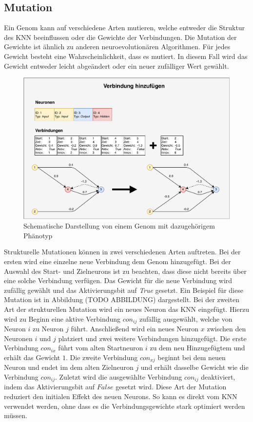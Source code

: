 \subsection{Mutation}
\label{subsec:neat_mutation}
Ein Genom kann auf verschiedene Arten mutieren, welche entweder die Struktur des \ac{KNN} beeinflussen oder die Gewichte der Verbindungen. Die Mutation der Gewichte ist ähnlich zu anderen neuroevolutionären Algorithmen. Für jedes Gewicht besteht eine Wahrscheinlichkeit, dass es mutiert. In diesem Fall wird das Gewicht entweder leicht abgeändert oder ein neuer zufälliger Wert gewählt.\\ %
\begin{figure}[!h]
	\centering
	\includegraphics[width=1\textwidth]{./img/neat-AddConnectionMutation.pdf} 
	\caption{Schematische Darstellung von einem Genom mit dazugehörigem Phänotyp}
	\label{fig:neat_add_connectin_mutation}
\end{figure}
Strukturelle Mutationen können in zwei verschiedenen Arten auftreten. Bei der ersten wird eine einzelne neue Verbindung dem Genom hinzugefügt. Bei der Auswahl des Start- und Zielneurons ist zu beachten, dass diese nicht bereits über eine solche Verbindung verfügen. Das Gewicht für die neue Verbindung wird zufällig gewählt und das Aktivierungsbit auf \emph{True} gesetzt. Ein Beispiel für diese Mutation ist in Abbildung (TODO ABBILDUNG) dargestellt. Bei der zweiten Art der strukturellen Mutation wird ein neues Neuron das \ac{KNN} eingefügt. Hierzu wird zu Beginn eine aktive Verbindung $con_{ij} $ zufällig ausgewählt, welche von Neuron $i$ zu Neuron $j$ führt. Anschließend wird ein neues Neuron $x$ zwischen den Neuronen $i$ und $j$ platziert und zwei weitere Verbindungen hinzugefügt. Die erste Verbindung $con_{ix}$ führt vom alten Startneuron $i$ zu dem neu Hinzugefügtem und erhält das Gewicht $1$. Die zweite Verbindung $con_{xj}$ beginnt bei dem neuen Neuron und endet im dem alten Zielneuron $j$ und erhält dasselbe Gewicht wie die Verbindung $con_{ij}$. Zuletzt wird die ausgewählte Verbindung $con_{ij}$ deaktiviert, indem das Aktivierungsbit auf $False$ gesetzt wird. Diese Art der Mutation reduziert den initialen Effekt des neuen Neurons. So kann es direkt vom \ac{KNN} verwendet werden, ohne dass es die Verbindungsgewichte stark optimiert werden müssen.
